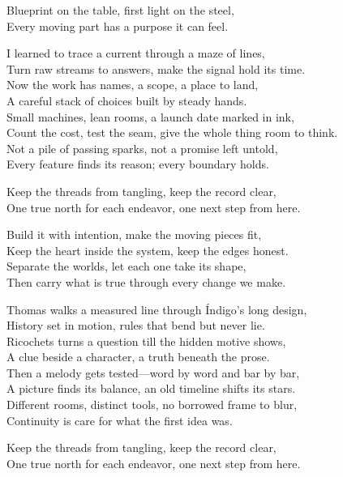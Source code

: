 \begin{lyrics}
Blueprint on the table, first light on the steel,\\
Every moving part has a purpose it can feel.

I learned to trace a current through a maze of lines,\\
Turn raw streams to answers, make the signal hold its time.\\
Now the work has names, a scope, a place to land,\\
A careful stack of choices built by steady hands.\\
Small machines, lean rooms, a launch date marked in ink,\\
Count the cost, test the seam, give the whole thing room to think.\\
Not a pile of passing sparks, not a promise left untold,\\
Every feature finds its reason; every boundary holds.

Keep the threads from tangling, keep the record clear,\\
One true north for each endeavor, one next step from here.

Build it with intention, make the moving pieces fit,\\
Keep the heart inside the system, keep the edges honest.\\
Separate the worlds, let each one take its shape,\\
Then carry what is true through every change we make.

Thomas walks a measured line through Índigo’s long design,\\
History set in motion, rules that bend but never lie.\\
Ricochets turns a question till the hidden motive shows,\\
A clue beside a character, a truth beneath the prose.\\
Then a melody gets tested—word by word and bar by bar,\\
A picture finds its balance, an old timeline shifts its stars.\\
Different rooms, distinct tools, no borrowed frame to blur,\\
Continuity is care for what the first idea was.

Keep the threads from tangling, keep the record clear,\\
One true north for each endeavor, one next step from here.


\end{lyrics}
